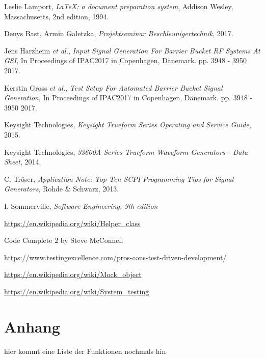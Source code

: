 \documentclass[../Report.tex]{subfiles}
\begin{document}


\begin{thebibliography}{9}

  Leslie Lamport,
  \textit{\LaTeX: a document preparation system},
  Addison Wesley, Massachusetts,
  2nd edition,
  1994.
  
	Denys Bast, Armin Galetzka, 
	\textit{Projektseminar Beschleunigertechnik},
	2017.
 
	Jens Harzheim \textit{et al.}, 
	\textit{Input Signal Generation For Barrier Bucket RF Systems At GSI}, In Proceedings of IPAC2017 in Copenhagen, Dänemark. 
	pp. 3948 - 3950
	2017.
	
	Kerstin Gross \textit{et al.},
	\textit{Test Setup For Automated Barrier Bucket Signal Generation},
	In Proceedings of IPAC2017 in Copenhagen, Dänemark. 
	pp. 3948 - 3950
	2017.
	
	Keysight Technologies,
	\textit{Keysight Trueform Series Operating and Service Guide},
	2015.

	Keysight Technologies,
	\textit{33600A Series Trueform Waveform Generators - Data Sheet},
	2014.
	
	C. Tröser, 
	\textit{Application Note: Top Ten SCPI Programming Tips for Signal Generators},
	Rohde \& Schwarz,
	2013.
	
	I. Sommerville,
	\textit{Software Engineering, 9th edition}
	
	\url{https://en.wikipedia.org/wiki/Helper_class}
	
	Code Complete 2 by Steve McConnell
	
	\url{https://www.testingexcellence.com/pros-cons-test-driven-development/}
	
	\url{https://en.wikipedia.org/wiki/Mock_object}
	
	\url{https://en.wikipedia.org/wiki/System_testing}	

\end{thebibliography}

\chapter{Anhang}
\label{chap:anhang}


hier kommt eine Liste der Funktionen nochmals hin
\end{document}
